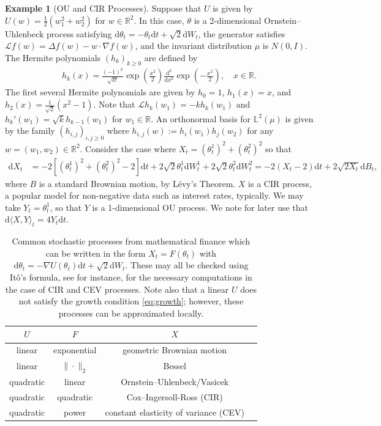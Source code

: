 \documentclass[11pt]{article}
\theoremstyle{plain}
\theoremstyle{definition}
\newtheorem{example}[theorem]{Example}
\theoremstyle{remark}
\numberwithin{equation}{section}
\newcommand{\R}{\mathbb{R}}
\renewcommand{\L}{\mathscr{L}}
\renewcommand{\d}{\mathrm{d}}
\newcommand{\lb}{\left}
\newcommand{\rb}{\right}
\newcommand{\bL}{\mathbb{L}}
\begin{document}
\begin{example}[OU and CIR Processes]
Suppose that $U$ is given by $U(w)=\frac{1}{2}(w_1^2+w_2^2)$ for $w\in\R^2$. In this case, $\theta$ is a 2-dimensional Ornstein--Uhlenbeck process satisfying $\d\theta_t=-\theta_t \d t+\sqrt{2}\d W_t$, the generator satisfies $\L f(w)=\Delta f(w) -w\cdot \nabla f(w)$, and the invariant distribution $\mu$ is $N(0,I)$. The Hermite polynomials $(h_k)_{k\ge 0}$ are defined by
\begin{align*}
h_k(x)=\frac{(-1)^k}{\sqrt{k!}}\exp\lb(\frac{x^2}{2}\rb)\frac{\d^k}{\d x^k}\exp\lb(-\frac{x^2}{2}\rb), \quad x\in \R.
\end{align*}
The first several Hermite polynomials are given by $h_0=1$, $h_1(x)=x$, and $h_2(x)=\frac{1}{\sqrt{2}}(x^2-1)$.
Note that $\L h_k(w_1)=-kh_k(w_1)$ and $h_k'(w_1)=\sqrt{k}h_{k-1}(w_1)$ for $w_1\in \R$.
An orthonormal basis for $\bL^2(\mu)$ is given by the family $(h_{i,j})_{i,j\ge 0}$ where $h_{i,j}(w):=h_i(w_1)h_j(w_2)$ for any $w=(w_1,w_2)\in \R^2$. Consider the case where $X_t=(\theta_t^1)^2+(\theta_t^2)^2$ so that
\begin{align*}
\d X_t &= -2\lb[(\theta_t^1)^2+(\theta_t^2)^2-2\rb]\d t+2\sqrt{2}\theta_t^1 \d W_t^1+2\sqrt{2}\theta_t^2 \d W_t^2=-2(X_t-2)\d t+2\sqrt{2X_t}\d B_t,
\end{align*}
where $B$ is a standard Brownian motion, by L\'{e}vy's Theorem. $X$ is a CIR process, a popular model for non-negative data such as interest rates, typically. We may take $Y_t=\theta_t^1$, so that $Y$ is a 1-dimensional OU process. We note for later use that $\d \langle X,Y\rangle_t=4Y_t \d t$.
\label{ex:example}
\end{example}

\begin{table}
\begin{center}
\begin{tabular}{| c | c | c | c |}
\hline
$U$ & $F$ & $X$  \\ 
\hline
linear & exponential & geometric Brownian motion\\
linear & $\|\cdot\|_2$ & Bessel\\
quadratic & linear & Ornstein--Uhlenbeck/Vasicek\\
quadratic & quadratic & Cox--Ingersoll-Ross (CIR)\\
quadratic & power & constant elasticity of variance (CEV)\\
\hline
\end{tabular}
\end{center}
\caption{Common stochastic processes from mathematical finance which can be written in the form $X_t=F(\theta_t)$ with $\d \theta_t = -\nabla U(\theta_t)\d t+\sqrt{2}\d W_t$. These may all be checked using It\^{o}'s formula, see for instance, \citet[Sections 2.6 and 6.4]{jeanblanc_mathematical_2009} for the necessary computations in the case of CIR and CEV processes. Note also that a linear $U$ does not satisfy the growth condition \eqref{eq:growth}; however, these processes can be approximated locally.}
\label{table:stochproc}
\end{table}
\end{document}
